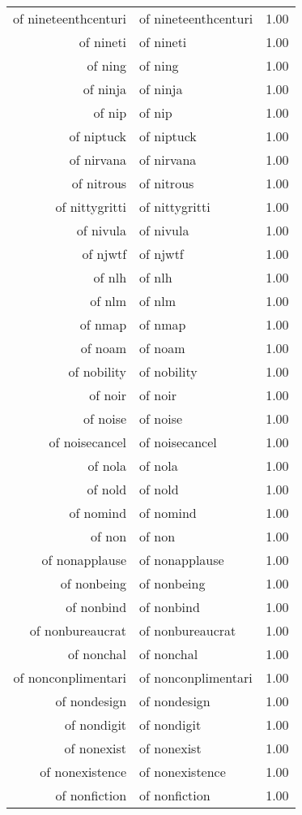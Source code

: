 \begin{table}[ht]
\begin{tabular}{rlr}
  of nineteenthcenturi & of nineteenthcenturi & 1.00 \\ 
  of nineti & of nineti & 1.00 \\ 
  of ning & of ning & 1.00 \\ 
  of ninja & of ninja & 1.00 \\ 
  of nip & of nip & 1.00 \\ 
  of niptuck & of niptuck & 1.00 \\ 
  of nirvana & of nirvana & 1.00 \\ 
  of nitrous & of nitrous & 1.00 \\ 
  of nittygritti & of nittygritti & 1.00 \\ 
  of nivula & of nivula & 1.00 \\ 
  of njwtf & of njwtf & 1.00 \\ 
  of nlh & of nlh & 1.00 \\ 
  of nlm & of nlm & 1.00 \\ 
  of nmap & of nmap & 1.00 \\ 
  of noam & of noam & 1.00 \\ 
  of nobility & of nobility & 1.00 \\ 
  of noir & of noir & 1.00 \\ 
  of noise & of noise & 1.00 \\ 
  of noisecancel & of noisecancel & 1.00 \\ 
  of nola & of nola & 1.00 \\ 
  of nold & of nold & 1.00 \\ 
  of nomind & of nomind & 1.00 \\ 
  of non & of non & 1.00 \\ 
  of nonapplause & of nonapplause & 1.00 \\ 
  of nonbeing & of nonbeing & 1.00 \\ 
  of nonbind & of nonbind & 1.00 \\ 
  of nonbureaucrat & of nonbureaucrat & 1.00 \\ 
  of nonchal & of nonchal & 1.00 \\ 
  of nonconplimentari & of nonconplimentari & 1.00 \\ 
  of nondesign & of nondesign & 1.00 \\ 
  of nondigit & of nondigit & 1.00 \\ 
  of nonexist & of nonexist & 1.00 \\ 
  of nonexistence & of nonexistence & 1.00 \\ 
  of nonfiction & of nonfiction & 1.00 \\ 

\end{tabular}
\end{table}
